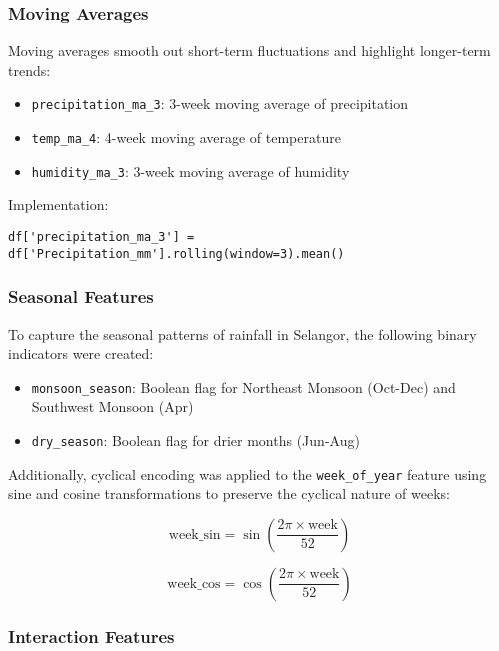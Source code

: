 \documentclass[12pt]{article}
\begin{document}
\subsubsection{Moving Averages}
\label{subsubsec:moving_averages}

Moving averages smooth out short-term fluctuations and highlight longer-term trends:
\begin{itemize}
    \item \texttt{precipitation\_ma\_3}: 3-week moving average of precipitation
    \item \texttt{temp\_ma\_4}: 4-week moving average of temperature
    \item \texttt{humidity\_ma\_3}: 3-week moving average of humidity
\end{itemize}

Implementation:
\begin{verbatim}
df['precipitation_ma_3'] = df['Precipitation_mm'].rolling(window=3).mean()
\end{verbatim}

\subsubsection{Seasonal Features}
\label{subsubsec:seasonal_features}

To capture the seasonal patterns of rainfall in Selangor, the following binary indicators were created:
\begin{itemize}
    \item \texttt{monsoon\_season}: Boolean flag for Northeast Monsoon (Oct-Dec) and Southwest Monsoon (Apr)
    \item \texttt{dry\_season}: Boolean flag for drier months (Jun-Aug)
\end{itemize}

Additionally, cyclical encoding was applied to the \texttt{week\_of\_year} feature using sine and cosine transformations to preserve the cyclical nature of weeks:

\begin{equation}
\text{week\_sin} = \sin\left(\frac{2\pi \times \text{week}}{52}\right)
\end{equation}

\begin{equation}
\text{week\_cos} = \cos\left(\frac{2\pi \times \text{week}}{52}\right)
\end{equation}

\subsubsection{Interaction Features}
\label{subsubsec:interaction_features}
\end{document}
